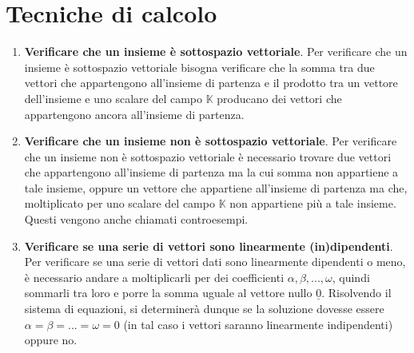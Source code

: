 \documentclass[12pt,a4paper,oneside]{book}
\begin{document}
\newpage

			   \section{Tecniche di calcolo}


\begin{enumerate}

\item \textbf{Verificare che un insieme è sottospazio vettoriale}. \linebreak
	  Per verificare che un insieme è sottospazio vettoriale bisogna verificare che la somma tra due 
	  vettori che appartengono all'insieme di partenza e il prodotto tra un vettore dell'insieme e uno 
	  scalare del campo $\mathbb{K}$ producano dei vettori che appartengono ancora all'insieme di 
	  partenza.


\item \textbf{Verificare che un insieme non è sottospazio vettoriale}. \linebreak
	  Per verificare che un insieme non è sottospazio vettoriale è necessario trovare due vettori che 
	  appartengono all'insieme di partenza ma la cui somma non appartiene a tale insieme, oppure un 
	  vettore che appartiene all'insieme di partenza ma che, moltiplicato per uno scalare del campo $
	  \mathbb{K}$ non appartiene più a tale insieme. Questi vengono anche chiamati controesempi.
	

\item \textbf{Verificare se una serie di vettori sono linearmente (in)dipendenti}. \linebreak
	  Per verificare se una serie di vettori dati sono linearmente dipendenti o meno, è necessario andare
	  a moltiplicarli per dei coefficienti $\alpha, \beta, ..., \omega$, quindi sommarli tra loro e porre
	  la somma uguale al vettore nullo $\underline{0}$. Risolvendo il sistema di equazioni, si
	  determinerà dunque se la soluzione dovesse essere $\alpha = \beta = ... = \omega = 0$ (in tal caso
	  i vettori saranno linearmente indipendenti) oppure no. \linebreak
	  \break
	  

\end{enumerate}
\end{document}
